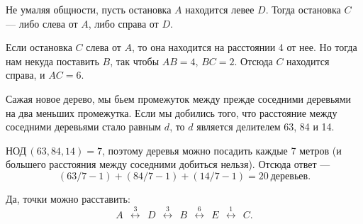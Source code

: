﻿
\begin{itemize}

\itA Не умаляя общности, пусть остановка $A$ находится левее $D$. Тогда остановка $C$ — либо слева от $A$, либо справа от $D$.

Если остановка $C$ слева от $A$, то она находится на расстоянии 4 от нее. Но тогда нам некуда поставить $B$, так чтобы $AB=4$, $BC=2$. Отсюда $C$ находится справа, и $AC=6$.

\itB Сажая новое дерево, мы бьем промежуток между прежде соседними деревьями на два меньших промежутка. Если мы добились того, что расстояние между соседними деревьями стало равным $d$, то $d$ является делителем 63, 84 и 14.

$\text{НОД}\,(63,84,14)=7$, поэтому деревья можно посадить каждые 7 метров (и большего расстояния между соседними добиться нельзя). Отсюда ответ —
$$(63/7-1)+(84/7-1)+(14/7-1) = 20\ \text{деревьев}.$$

\def\disbetw#1{\ \ \stackrel{#1}{\longleftrightarrow}\ \ }

\itC Да, точки можно расставить:
$$A \disbetw 3 D \disbetw 3 B \disbetw 6 E \disbetw 1 C.$$
\end{itemize}